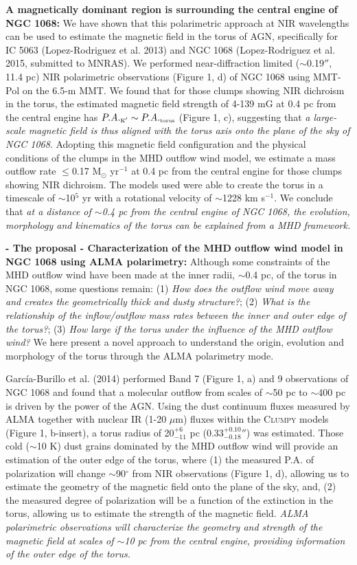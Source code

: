 \documentclass[12pt,a4paper]{article}  %
\begin{document}
\textbf{A magnetically dominant region is surrounding the central engine of NGC 1068:} We have shown that this polarimetric approach at NIR wavelengths can be used to estimate the magnetic field in the torus of AGN, specifically for IC 5063 (Lopez-Rodriguez et al. 2013) and NGC 1068 (Lopez-Rodriguez et al. 2015, submitted to MNRAS). We performed near-diffraction limited ($\sim$0.19$''$, 11.4 pc) NIR polarimetric observations (Figure 1, d) of NGC 1068 using MMT-Pol on the 6.5-m MMT. We found that for those clumps showing NIR dichroism in the torus, the estimated magnetic field strength of 4-139 mG at 0.4 pc from the central engine has $P.A._{\mbox{\tiny K$'$}} \sim P.A._{\mbox{\tiny torus}}$ (Figure 1, c), suggesting that \textit{a large-scale magnetic field is thus aligned with the torus axis onto the plane of the sky of NGC 1068}. Adopting this magnetic field configuration and the physical conditions of the clumps in the MHD outflow wind model, we estimate a mass outflow rate $\le$0.17 M$_{\odot}$ yr$^{-1}$ at 0.4 pc from the central engine for those clumps showing NIR dichroism. The models used were able to create the torus in a timescale of $\sim$10$^{5}$ yr with a rotational velocity of $\sim$1228 km s$^{-1}$. We conclude that \textit{at a distance of $\sim$0.4 pc from the central engine of NGC 1068, the evolution, morphology and kinematics of the torus can be explained from a MHD framework.} 
  

\textbf{- The proposal - Characterization of the MHD outflow wind model in NGC 1068 using ALMA polarimetry:} Although some constraints of the MHD outflow wind have been made at the inner radii, $\sim$0.4 pc, of the torus in NGC 1068, some questions remain: (1) \textit{How does the outflow wind move away and creates the geometrically thick and dusty structure?}; (2) \textit{What is the relationship of the inflow/outflow mass rates between the inner and outer edge of the torus?}; (3) \textit{How large if the torus under the influence of the MHD outflow wind?} We here present a novel approach to understand the origin, evolution and morphology of the torus through the ALMA polarimetry mode.

Garc\'ia-Burillo et al. (2014) performed Band 7 (Figure 1, a) and 9 observations of NGC 1068 and found that a molecular outflow from scales of $\sim$50 pc to $\sim$400 pc is driven by the power of the AGN. Using the dust continuum fluxes measured by ALMA together with nuclear IR (1-20 $\mu$m) fluxes within the \textsc{Clumpy} models (Figure 1, b-insert), a torus radius of 20$^{+6}_{-11}$ pc (0.33$^{+0.10}_{-0.18}$$''$) was estimated. Those cold ($\sim$10 K) dust grains dominated by the MHD outflow wind will provide an estimation of the outer edge of the torus, where (1) the measured P.A. of polarization will change $\sim$90$^{\circ}$ from NIR observations (Figure 1, d), allowing us to estimate the geometry of the magnetic field onto the plane of the sky, and, (2) the measured degree of polarization will be a function of the extinction in the torus, allowing us to estimate the strength of the magnetic field. \textit{ALMA polarimetric observations will characterize the geometry and strength of the magnetic field at scales of $\sim$10 pc from the central engine, providing information of the outer edge of the torus.}
\end{document}
